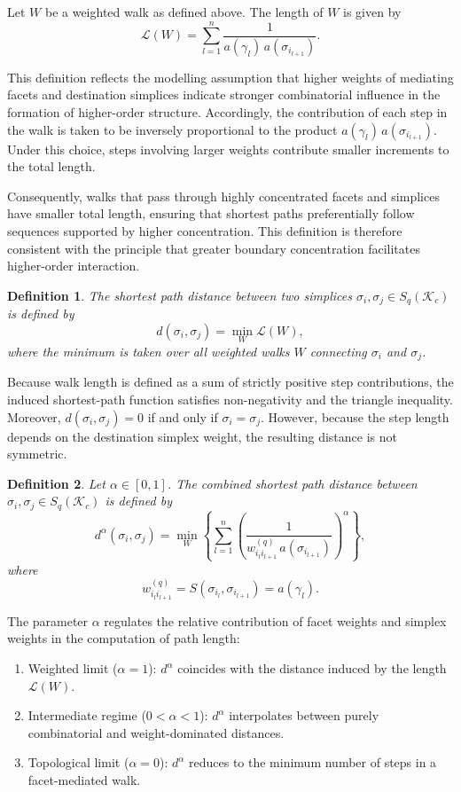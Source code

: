 \documentclass[12pt]{article}
\theoremstyle{normalhead_nobrackets}
\newtheorem{definition}{Definition}[section]
\theoremstyle{exampstyle}
\begin{document}
Let $W$ be a weighted walk as defined above. The {length} of $W$ is given by
\[
\mathcal{L}(W)
=
\sum_{l=1}^{n}
\frac{1}{a(\gamma_l)\, a(\sigma_{i_{l+1}})}.
\]

This definition reflects the modelling assumption that higher weights of mediating facets and destination simplices indicate stronger combinatorial influence in the formation of higher-order structure. Accordingly, the contribution of each step in the walk is taken to be inversely proportional to the product $a(\gamma_l)\, a(\sigma_{i_{l+1}})$. Under this choice, steps involving larger weights contribute smaller increments to the total length.

Consequently, walks that pass through highly concentrated facets and simplices have smaller total length, ensuring that shortest paths preferentially follow sequences supported by higher concentration. This definition is therefore consistent with the principle that greater boundary concentration facilitates higher-order interaction.


\begin{definition}
The shortest path distance between two simplices $\sigma_i, \sigma_j \in S_q(\mathcal{K}_c)$ is defined by
\[
d(\sigma_i, \sigma_j)
=
\min_{W} \mathcal{L}(W),
\]
where the minimum is taken over all weighted walks $W$ connecting $\sigma_i$ and $\sigma_j$.
\end{definition}

Because walk length is defined as a sum of strictly positive step contributions, the induced shortest-path function satisfies non-negativity and the triangle inequality.
Moreover, $d(\sigma_i,\sigma_j)=0$ if and only if $\sigma_i=\sigma_j$. 
However, because the step length depends on the destination simplex weight, the resulting distance is not symmetric. 



\begin{definition}
Let $\alpha \in [0,1]$. The {combined shortest path distance} between $\sigma_i, \sigma_j \in S_q(\mathcal{K}_c)$ is defined by
\[
d^{\alpha}(\sigma_i, \sigma_j)
=
\min_{W}
\left\{
\sum_{l=1}^{n}
\left(
\frac{1}{w^{(q)}_{i_l i_{l+1}} \, a(\sigma_{i_{l+1}})}
\right)^{\alpha}
\right\},
\]
where
\[
w^{(q)}_{i_l i_{l+1}} = S(\sigma_{i_l}, \sigma_{i_{l+1}}) = a(\gamma_l).
\]
\end{definition}

The parameter $\alpha$ regulates the relative contribution of facet weights and simplex weights in the computation of path length:
\begin{enumerate}
    \item[(i)] Weighted limit ($\alpha = 1$): $d^{\alpha}$ coincides with the distance induced by the length $\mathcal{L}(W)$.
    \item[(ii)] Intermediate regime ($0 < \alpha < 1$): $d^{\alpha}$ interpolates between purely combinatorial and weight-dominated distances.
    \item[(iii)] Topological limit ($\alpha = 0$): $d^{\alpha}$ reduces to the minimum number of steps in a facet-mediated walk.
\end{enumerate}
\end{document}
